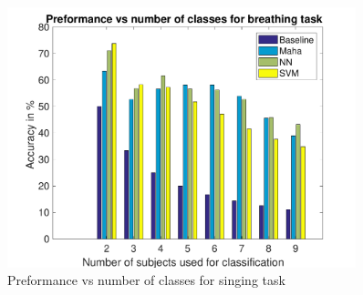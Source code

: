 		\begin{figure}[hbtp]
	    	\centering
	    	\includegraphics[width=0.9\textwidth]{Chapter-5/song_base}
	    	\caption{Preformance vs number of classes for singing task}
	    	\label{fig:chap5song}
	    \end{figure}
	    \FloatBarrier


    	

